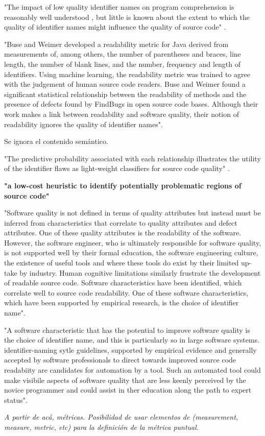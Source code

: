 "The impact of low quality identifier names on program comprehension is reasonably
well understood \cite{DeiBenbockPizka05,Lawrie2007,Lawrie2006}, but little is known
about the extent to which the quality of identifier names might influence the quality
of source code" \cite{ButlerWemelingerYu10}.

"Buse and Weimer \cite{Buse2008} developed a readability metric for Java derived from measurements 
of, among others, the number of parentheses and braces, line length, the number
of blank lines, and the number, frequency and length of identifiers.
Using machine learning, the readability metric was trained to agree with the judgement 
of human source code readers.
Buse and Weimer found a significant statistical relationship between the readability of 
methods and the presence of defects found by FindBugs in open source code bases. 
Although their work makes a link between readability and software quality, their notion
of readability ignores the quality of identifier names".

Se ignora el contenido semántico.

"The predictive probability associated with each relationship illustrates the utility
of the identifier flaws as light-weight classifiers for source code quality"
\cite{ButlerWemelingerYu10}.

\textbf{"a low-cost heuristic to identify potentially problematic regions of source code"}

"Software quality is not defined in terms of quality attributes but instead must be
inferred from characteristics that correlate to quality attributes and defect attributes.
One of these quality attributes is the readability of the software.
However, the software engineer, who is ultimately responsible for software quality,
is not supported well by their formal education, the software engineering culture, the
existence of useful tools and where these tools do exist by their limited up-take by industry.
Human cognitive limitations similarly frustrate the development of readable source code.
Software characteristics have been identified, which correlate well to source code readability.
One of these software characteristics, which have been supported by empirical research,
is the choice of identifier name".\cite{Relf04}

"A software characteristic that has the potential to improve software quality is the choice of
identifier name, and this is particularly so in large software systems.
identifier-naming sytle guidelines, supported by empirical evidence and generally accepted by
software professionals to direct towards improved source code readabiity are candidates for
automation by a tool.
Such an automated tool could make visibile aspects of software quality that are less keenly
perceived by the novice programmer and could assist in ther education along the path to
expert status"\cite{Relf04}.

\textit{A partir de acá, métricas.
Posibilidad de usar elementos de (measurement, measure, metric, etc) para la definición de
la métrica puntual.}

